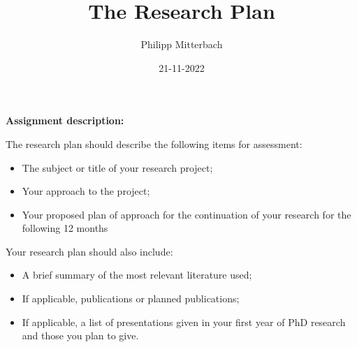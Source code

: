 

\usepackage{lipsum}

\usepackage{booktabs, tabularx}
\usepackage{parskip}


	



   \title{The Research Plan}
   \author{Philipp Mitterbach}
   \date{21-11-2022}
   \maketitle
   
   \vspace{5cm}
   \textbf{Assignment description:} \par The research plan should describe the following items for assessment:
   \begin{itemize}
   \item The subject or title of your research project;
   \item Your approach to the project;
   \item Your proposed plan of approach for the continuation of your research for the following 12 months
   \end{itemize}

   Your research plan should also include:
   \begin{itemize}
   \item A brief summary of the most relevant literature used;
   \item If applicable, publications or planned publications;
   \item If applicable, a list of presentations given in your first year of PhD research and those you plan to give.
   \end{itemize}

   

   
   


